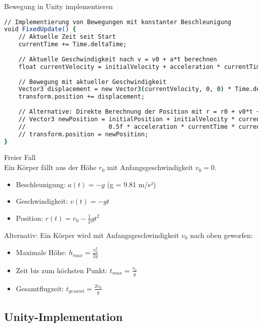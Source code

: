 \begin{examplecode}{Bewegung in Unity implementieren}\\
    \begin{lstlisting}[language=csh, style=basesmol]
// Implementierung von Bewegungen mit konstanter Beschleunigung
void FixedUpdate() {
    // Aktuelle Zeit seit Start
    currentTime += Time.deltaTime;
    
    // Aktuelle Geschwindigkeit nach v = v0 + a*t berechnen
    float currentVelocity = initialVelocity + acceleration * currentTime;
    
    // Bewegung mit aktueller Geschwindigkeit
    Vector3 displacement = new Vector3(currentVelocity, 0, 0) * Time.deltaTime;
    transform.position += displacement;
    
    // Alternative: Direkte Berechnung der Position mit r = r0 + v0*t + 0.5*a*t^2
    // Vector3 newPosition = initialPosition + initialVelocity * currentTime + 
    //                       0.5f * acceleration * currentTime * currentTime;
    // transform.position = newPosition;
}
    \end{lstlisting}
\end{examplecode}

\begin{example2}{Freier Fall}\\
    Ein Körper fällt aus der Höhe $r_0$ mit Anfangsgeschwindigkeit $v_0 = 0$.
    
    \begin{itemize}
        \item Beschleunigung: $a(t) = -g$ (g = 9.81 m/s²)
        \item Geschwindigkeit: $v(t) = -gt$
        \item Position: $r(t) = r_0 - \frac{1}{2}gt^2$
    \end{itemize}
    
    Alternativ: Ein Körper wird mit Anfangsgeschwindigkeit $v_0$ nach oben geworfen:
    \begin{itemize}
        \item Maximale Höhe: $h_{max} = \frac{v_0^2}{2g}$ 
        \item Zeit bis zum höchsten Punkt: $t_{max} = \frac{v_0}{g}$
        \item Gesamtflugzeit: $t_{gesamt} = \frac{2v_0}{g}$
    \end{itemize}
\end{example2}

\subsection{Unity-Implementation}

